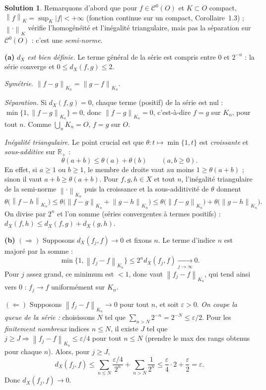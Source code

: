 \documentclass[11pt,a4paper]{article}
\newcommand{\R}{\mathbb{R}}
\newcommand{\norm}[1]{\left\|#1\right\|}
\newcommand{\Cz}{\mathcal{C}^0}
\newcommand{\ie}{c'est-à-dire}
\theoremstyle{definition}
\newtheorem*{solution}{Solution}
\begin{document}
\begin{solution}
Remarquons d'abord que pour $f\in\Cz(O)$ et $K\subset O$ compact, $\norm f_K=\sup_K|f|<+\infty$ (fonction continue sur un compact, Corollaire~1.3) ; $\norm\cdot_{K}$ vérifie l'homogénéité et l'inégalité triangulaire, mais pas la séparation sur $\Cz(O)$ : c'est une \emph{semi-norme}.

\medskip
\noindent\textbf{(a)} \emph{$d_X$ est bien définie.} Le terme général de la série est compris entre $0$ et $2^{-n}$ : la série converge et $0\le d_X(f,g)\le2$.

\emph{Symétrie.} $\norm{f-g}_{K_n}=\norm{g-f}_{K_n}$.

\emph{Séparation.} Si $d_X(f,g)=0$, chaque terme (positif) de la série est nul : $\min\{1,\norm{f-g}_{K_n}\}=0$, donc $\norm{f-g}_{K_n}=0$, \ie{} $f=g$ sur $K_n$, pour tout $n$. Comme $\bigcup_nK_n=O$, $f=g$ sur $O$.

\emph{Inégalité triangulaire.} Le point crucial est que $\theta:t\mapsto\min\{1,t\}$ est \emph{croissante} et \emph{sous-additive} sur $\R_+$ :
\[
\theta(a+b)\le\theta(a)+\theta(b)\qquad(a,b\ge0).
\]
En effet, si $a\ge1$ ou $b\ge1$, le membre de droite vaut au moins $1\ge\theta(a+b)$ ; sinon il vaut $a+b\ge\theta(a+b)$. Pour $f,g,h\in X$ et tout $n$, l'inégalité triangulaire de la semi-norme $\norm\cdot_{K_n}$ puis la croissance et la sous-additivité de $\theta$ donnent
\[
\theta\big(\norm{f-h}_{K_n}\big)\le\theta\big(\norm{f-g}_{K_n}+\norm{g-h}_{K_n}\big)\le\theta\big(\norm{f-g}_{K_n}\big)+\theta\big(\norm{g-h}_{K_n}\big).
\]
On divise par $2^n$ et l'on somme (séries convergentes à termes positifs) : $d_X(f,h)\le d_X(f,g)+d_X(g,h)$.

\medskip
\noindent\textbf{(b)} $(\Rightarrow)$ Supposons $d_X(f_j,f)\to0$ et fixons $n$. Le terme d'indice $n$ est majoré par la somme :
\[
\min\{1,\norm{f_j-f}_{K_n}\}\le2^nd_X(f_j,f)\xrightarrow[j\to\infty]{}0 .
\]
Pour $j$ assez grand, ce minimum est $<1$, donc vaut $\norm{f_j-f}_{K_n}$, qui tend ainsi vers $0$ : $f_j\to f$ uniformément sur $K_n$.

$(\Leftarrow)$ Supposons $\norm{f_j-f}_{K_n}\to0$ pour tout $n$, et soit $\varepsilon>0$. \emph{On coupe la queue de la série :} choisissons $N$ tel que $\sum_{n>N}2^{-n}=2^{-N}\le\varepsilon/2$. Pour les \emph{finitement nombreux} indices $n\le N$, il existe $J$ tel que $j\ge J\Rightarrow\norm{f_j-f}_{K_n}\le\varepsilon/4$ pour tout $n\le N$ (prendre le max des rangs obtenus pour chaque $n$). Alors, pour $j\ge J$,
\[
d_X(f_j,f)\le\sum_{n\le N}\frac{\varepsilon/4}{2^n}+\sum_{n>N}\frac1{2^n}\le\frac\varepsilon4\cdot2+\frac\varepsilon2=\varepsilon .
\]
Donc $d_X(f_j,f)\to0$.


\end{solution}
\end{document}

